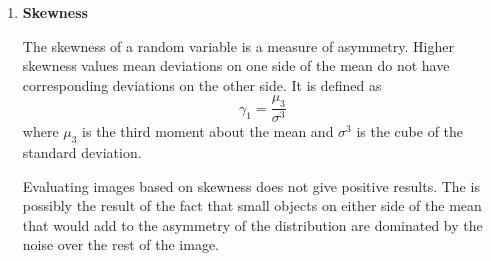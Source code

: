 \begin{enumerate}
\item{\textbf{Skewness}}

The skewness of a random variable is a measure of asymmetry.  Higher skewness values mean deviations on one side of the mean do not have corresponding deviations on the other side.  It is defined as $$\gamma_1=\frac{\mu_3}{\sigma^3}$$ where $\mu_3$ is the third moment about the mean and $\sigma^3$ is the cube of the standard deviation.

Evaluating images based on skewness does not give positive results.  The is possibly the result of the fact that small objects on either side of the mean that would add to the asymmetry of the distribution are dominated by the noise over the rest of the image.


\end{enumerate}


